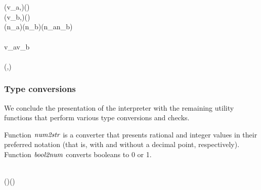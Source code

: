 \begin{hscode}
\\
\>[B]{}\<[4]%
\>[4]{}\<[E]%
\\
\>[4]{}\<[7]%
\>[7]{}(v_a,){}\<[19]%
\>[19]{}\mathrel{=}\mathbin{\$}(\;)\;\;\;{}\<[52]%
\>[52]{}\<[E]%
\\
\>[4]{}\<[7]%
\>[7]{}(v_b,){}\<[19]%
\>[19]{}\mathrel{=}\mathbin{\$}(\;)\;\;\;\<[E]%
\\[\blanklineskip]%
\>[4]{}\<[7]%
\>[7]{}\;(\;n_a)\;{}\<[27]%
\>[27]{}(\;n_b){}\<[43]%
\>[43]{}\mathrel{=}\;(\;n_a\;n_b){}\<[E]%
\\
\>[4]{}\<[7]%
\>[7]{}\;\anonymous \;{}\<[27]%
\>[27]{}\anonymous {}\<[43]%
\>[43]{}\mathrel{=}\;\<[E]%
\\[\blanklineskip]%
\>[4]{}\<[7]%
\>[7]{}\mathrel{=}\;\;v_a\;v_b{}\<[E]%
\\
\>[B]{}\<[4]%
\>[4]{}\<[E]%
\\
\>[4]{}\<[7]%
\>[7]{}(,){}\<[E]%
\ColumnHook
\end{hscode}\resethooks

\subsubsection{Type conversions}
\label{typeconv}

We conclude the presentation of the interpreter with the remaining
utility functions that perform various type conversions and checks.

Function \ensuremath{\Varid{num2str}} is a converter that presents rational and integer values
in their preferred notation (that is, with and without a decimal point,
respectively). Function \ensuremath{\Varid{bool2num}} converts booleans to 0 or 1.

\begin{hscode}\SaveRestoreHook
{}%
%
\>[B]{}\mathbin{::}\to {}\<[E]%
\\
\>[B]{}\;\mathrel{=}\;\;(\;)\not\equiv {}\;\;\;\;\;\;(\;){}\<[E]%
\\[\blanklineskip]%
\>[B]{}\mathbin{::}\to {}\<[E]%
\\
\>[B]{}\;\mathrel{=}\;\equiv {}\;\;\;\;\<[E]%
\ColumnHook
\end{hscode}\resethooks

